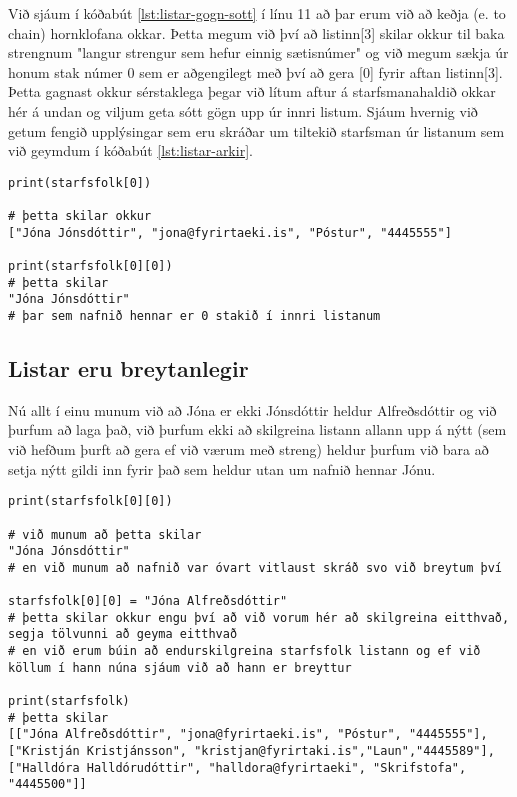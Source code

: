 Við sjáum í kóðabút \ref{lst:listar-gogn-sott} í línu 11 að þar erum við að keðja (e. to chain) hornklofana okkar.
Þetta megum við því að listinn[3] skilar okkur til baka strengnum "langur strengur sem hefur einnig sætisnúmer" og við megum sækja úr honum stak númer 0 sem er aðgengilegt með því að gera [0] fyrir aftan listinn[3].
Þetta gagnast okkur sérstaklega þegar við lítum aftur á starfsmanahaldið okkar hér á undan og viljum geta sótt gögn upp úr innri listum.
Sjáum hvernig við getum fengið upplýsingar sem eru skráðar um tiltekið starfsman úr listanum sem við geymdum í kóðabút \ref{lst:listar-arkir}.

\begin{lstlisting}[caption=Unnið með gögn úr lista, label=lst:listar-gagnanotkun]
print(starfsfolk[0])

# þetta skilar okkur 
["Jóna Jónsdóttir", "jona@fyrirtaeki.is", "Póstur", "4445555"]

print(starfsfolk[0][0])
# þetta skilar
"Jóna Jónsdóttir"
# þar sem nafnið hennar er 0 stakið í innri listanum
\end{lstlisting}

\subsection{Listar eru breytanlegir}
Nú allt í einu munum við að Jóna er ekki Jónsdóttir heldur Alfreðsdóttir og við þurfum að laga það, við þurfum ekki að skilgreina listann allann upp á nýtt (sem við hefðum þurft að gera ef við værum með streng) heldur þurfum við bara að setja nýtt gildi inn fyrir það sem heldur utan um nafnið hennar Jónu.

\begin{lstlisting}[caption=Unnið með gögn úr lista, label=lst:listar-gagnabreyting]
print(starfsfolk[0][0])

# við munum að þetta skilar 
"Jóna Jónsdóttir"
# en við munum að nafnið var óvart vitlaust skráð svo við breytum því

starfsfolk[0][0] = "Jóna Alfreðsdóttir"
# þetta skilar okkur engu því að við vorum hér að skilgreina eitthvað, segja tölvunni að geyma eitthvað
# en við erum búin að endurskilgreina starfsfolk listann og ef við köllum í hann núna sjáum við að hann er breyttur

print(starfsfolk) 
# þetta skilar 
[["Jóna Alfreðsdóttir", "jona@fyrirtaeki.is", "Póstur", "4445555"], ["Kristján Kristjánsson", "kristjan@fyrirtaki.is","Laun","4445589"], ["Halldóra Halldórudóttir", "halldora@fyrirtaeki", "Skrifstofa", "4445500"]]
\end{lstlisting}

